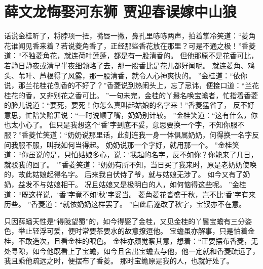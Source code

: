 \chapter[薛文龙悔娶河东狮 \quad 贾迎春误嫁中山狼]
{薛文龙悔娶河东狮 \quad 贾迎春误嫁中山狼}

\par
话说金桂听了，将脖项一扭，嘴唇一撇，鼻孔里哧哧两声，拍着掌冷笑道：“菱角花谁闻见香来着？若说菱角香了，正经那些香花放在那里？可是不通之极！”香菱道：“不独菱角花，就连荷叶莲蓬，都是有一股清香的。
但他那原不是花香可比，若静日静夜或清早半夜细领略了去，那一股香比是花儿都好闻呢。
就连菱角、鸡头、苇叶、芦根得了风露，那一股清香，就令人心神爽快的。
”金桂道：“依你说，那兰花桂花倒香的不好了？”香菱说到热闹头上，忘了忌讳，便接口道：“兰花桂花的香，又非别花之香可比。
”一句未完，金桂的丫鬟名唤宝蟾者，忙指着香菱的脸儿说道：“要死，要死！你怎么真叫起姑娘的名字来！”香菱猛省了，
反不好意思，忙陪笑赔罪说：“一时说顺了嘴，奶奶别计较。
”金桂笑道：“这有什么，你也太小心了。
但只是我想这个‘香’字到底不妥，意思要换一个字，不知你服不服？”香菱忙笑道：“奶奶说那里话，此刻连我一身一体俱属奶奶，何得换一名字反问我服不服，叫我如何当得起。
奶奶说那一个字好，就用那一个。
”金桂笑道：“你虽说的是，只怕姑娘多心，说：‘我起的名字，反不如你？你能来了几日，就驳我的回了。
’”香菱笑道：“奶奶有所不知，当日买了我来时，原是老奶奶使唤的，故此姑娘起得名字。
后来我自伏侍了爷，就与姑娘无涉了。
如今又有了奶奶，益发不与姑娘相干。
况且姑娘又是极明白的人，如何恼得这些呢。
”金桂道：“既这样说，‘香’字竟不如‘秋’字妥当。
菱角菱花皆盛于秋，岂不比‘香’字有来历些。
”香菱道：“就依奶奶这样罢了。
”自此后遂改了秋字，宝钗亦不在意。
\par
只因薛蟠天性是“得陇望蜀”的，如今得娶了金桂，又见金桂的丫鬟宝蟾有三分姿色，举止轻浮可爱，便时常要茶要水的故意撩逗他。
宝蟾虽亦解事，只是怕着金桂，不敢造次，且看金桂的眼色。
金桂亦颇觉察其意，想着：“正要摆布香菱，无处寻隙，如今他既看上了宝蟾，如今且舍出宝蟾去与他，他一定就和香菱疏远了，我且乘他疏远之时，便摆布了香菱。
那时宝蟾原是我的人，也就好处了。
